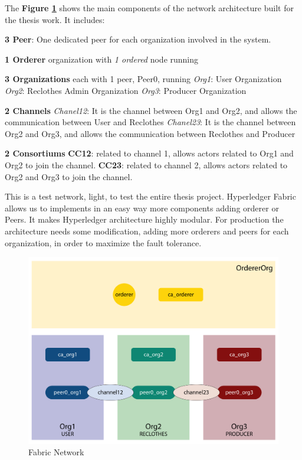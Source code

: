 The \textbf{Figure \ref{fig:fabric_network}} shows the main components of the network architecture 
built for the thesis work. It includes:

\begin{outline}[enumerate]
    \1 \textbf{3 Peer}: One dedicated peer for each organization involved in the system. 

    \1 \textbf{1 Orderer} organization with \textit{1 ordered} node running

    \1 \textbf{3 Organizations} each with 1 peer, Peer0, running
    \2 \textit{Org1}: User Organization
    \2 \textit{Org2}: Reclothes Admin Organization 
    \2 \textit{Org3}: Producer Organization

    \1 \textbf{2 Channels}
    \2 \textit{Chanel12}: It is the channel between Org1 and Org2, and allows the communication between User and Reclothes
    \2 \textit{Chanel23}: It is the channel between Org2 and Org3, and allows the communication between Reclothes and Producer

    \1 \textbf{2 Consortiums}
    \1 \textbf{CC12}: related to channel 1, allows actors related to Org1 and Org2 to join the channel.
    \1 \textbf{CC23}: related to channel 2, allows actors related to Org2 and Org3 to join the channel.
\end{outline}

\bigskip
This is a test network, light, to test the entire thesis project. Hyperledger Fabric allows us to implements in an easy way more components adding
orderer or Peers. It makes Hyperledger architecture highly modular. For production the architecture needs some modification,
adding more orderers and peers for each organization, in order to maximize the fault tolerance.   

\begin{figure}[h!]
	\centering
	\includegraphics[totalheight=10cm]{img/fabric_network.png}
	\caption{Fabric Network}
	\label{fig:fabric_network}
\end{figure}

